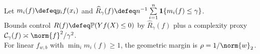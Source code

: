 \begin{remark} \label{rem:sl-margin-generalization} \\
Let $m_i(f)\defeq y_if(x_i)$ and $\widehat{R}_\gamma(f)\defeq n^{-1}\sum\limits_{i=1}^n\mathbf{1}\{m_i(f)\leq\gamma\}$.\\
Bounds control $R(f)\defeq\mathbb{P}(Yf(X)\leq0)$ by $\widehat{R}_\gamma(f)$ plus a complexity proxy $\mathcal{C}_\gamma(f)\asymp\norm{f}^2/\gamma^2$.\\
For linear $f_{w,b}$ with $\min_i m_i(f)\geq1$, the geometric margin is $\rho=1/\norm{w}_2$.
\end{remark}
